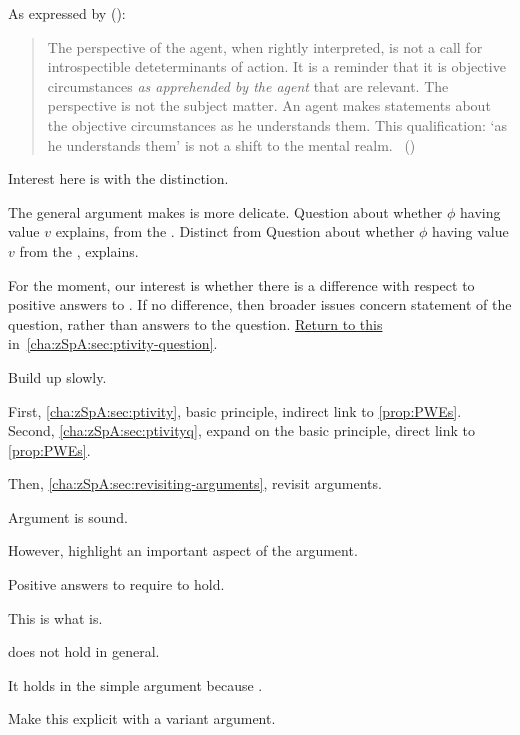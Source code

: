 \begin{note}
  As expressed by \citeauthor{Collins:1997wn} (\citeyear{Collins:1997wn}):
  \begin{quote}
    The perspective of the agent, when rightly interpreted, is not a call for introspectible deteterminants of action.
    It is a reminder that it is objective circumstances \emph{as apprehended by the agent} that are relevant.
    The perspective is not the subject matter.
    An agent makes statements about the objective circumstances as he understands them.
    This qualification: `as he understands them' is not a shift to the mental realm.%
    \mbox{ }\hfill\mbox{(\citeyear[120]{Collins:1997wn})}
  \end{quote}
\end{note}

\begin{note}
  Interest here is with the distinction.

  The general argument \citeauthor{Dancy:2000aa} makes is more delicate.
  Question about whether \(\phi\) having value \(v\) explains, from the \agpe{}.
  Distinct from Question about whether \(\phi\) having value \(v\) from the \agpe{}, explains.

  For the moment, our interest is whether there is a difference with respect to positive answers to \qzS{}.
  If no difference, then broader issues concern statement of the question, rather than answers to the question.
  \hyperref[return-to-dancy]{Return to this} in~\autoref{cha:zSpA:sec:ptivity-question}.
\end{note}

\begin{note}
  Build up slowly.

  First, \autoref{cha:zSpA:sec:ptivity}, basic principle, indirect link to \autoref{prop:PWEs}.
  Second, \autoref{cha:zSpA:sec:ptivityq}, expand on the basic principle, direct link to \autoref{prop:PWEs}.

  Then, \autoref{cha:zSpA:sec:revisiting-arguments}, revisit arguments.
\end{note}


\begin{note}
  Argument is sound.

  However, highlight an important aspect of the argument.

  Positive answers to \qzS{} require \ptivity{} to hold.

  This is what \ptivity{} is.

  \ptivity{} does not hold in general.

  It holds in the simple argument because \qzS{}.

  Make this explicit with a variant argument.
\end{note}

